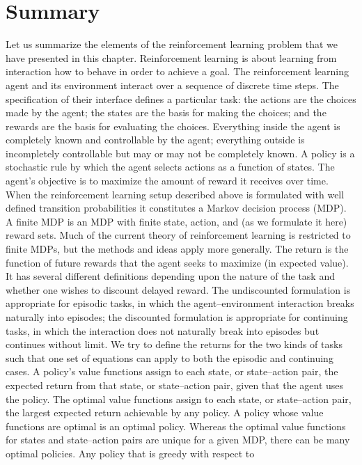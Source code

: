 \section{Summary}
\label{sec:fmdps-summary}
Let us summarize the elements of the reinforcement learning problem that we have
presented in this chapter. Reinforcement learning is about learning from interaction
how to behave in order to achieve a goal. The reinforcement learning agent and its
environment interact over a sequence of discrete time steps. The specification of their
interface defines a particular task: the actions are the choices made by the agent; the
states are the basis for making the choices; and the rewards are the basis for evaluating
the choices. Everything inside the agent is completely known and controllable by the
agent; everything outside is incompletely controllable but may or may not be completely
known. A policy is a stochastic rule by which the agent selects actions as a function of
states. The agent’s objective is to maximize the amount of reward it receives over time.
When the reinforcement learning setup described above is formulated with well defined
transition probabilities it constitutes a Markov decision process (MDP). A finite MDP is
an MDP with finite state, action, and (as we formulate it here) reward sets. Much of the
current theory of reinforcement learning is restricted to finite MDPs, but the methods
and ideas apply more generally.
The return is the function of future rewards that the agent seeks to maximize (in
expected value). It has several different definitions depending upon the nature of the
task and whether one wishes to discount delayed reward. The undiscounted formulation
is appropriate for episodic tasks, in which the agent–environment interaction breaks
naturally into episodes; the discounted formulation is appropriate for continuing tasks, in
which the interaction does not naturally break into episodes but continues without limit.
We try to define the returns for the two kinds of tasks such that one set of equations can
apply to both the episodic and continuing cases.
A policy’s value functions assign to each state, or state–action pair, the expected return
from that state, or state–action pair, given that the agent uses the policy. The optimal
value functions assign to each state, or state–action pair, the largest expected return
achievable by any policy. A policy whose value functions are optimal is an optimal policy.
Whereas the optimal value functions for states and state–action pairs are unique for a
given MDP, there can be many optimal policies. Any policy that is greedy with respect to
